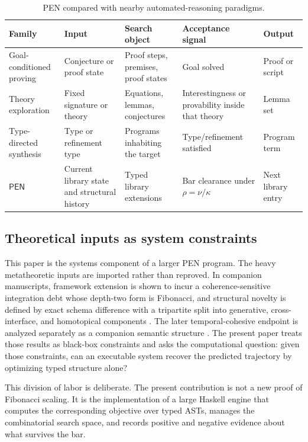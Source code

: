 \documentclass[pdflatex,sn-mathphys,Numbered]{sn-jnl}
\theoremstyle{thmstyleone}
\theoremstyle{thmstylethree}
\theoremstyle{thmstyletwo}
\newcommand{\PEN}{\ensuremath{\mathsf{PEN}}}
\begin{document}
\begin{table}[t]
\centering
\caption{PEN compared with nearby automated-reasoning paradigms.}
\label{tab:comparison}
\footnotesize
\begin{tabular}{@{}p{2.55cm}p{2.35cm}p{2.5cm}p{2.6cm}p{2.1cm}@{}}
\toprule
Family & Input & Search object & Acceptance signal & Output \\
\midrule
Goal-conditioned proving & Conjecture or proof state & Proof steps, premises, proof states & Goal solved & Proof or script \\
Theory exploration & Fixed signature or theory & Equations, lemmas, conjectures & Interestingness or provability inside that theory & Lemma set \\
Type-directed synthesis & Type or refinement type & Programs inhabiting the target & Type/refinement satisfied & Program term \\
\PEN{} & Current library state and structural history & Typed library extensions & Bar clearance under $\rho=\nu/\kappa$ & Next library entry \\
\bottomrule
\end{tabular}
\end{table}

\subsection{Theoretical inputs as system constraints}

This paper is the systems component of a larger PEN program. The heavy metatheoretic inputs are imported rather than reproved. In companion manuscripts, framework extension is shown to incur a coherence-sensitive integration debt whose depth-two form is Fibonacci, and structural novelty is defined by exact schema difference with a tripartite split into generative, cross-interface, and homotopical components \cite{lande-coherence,lande-generative}. The later temporal-cohesive endpoint is analyzed separately as a companion semantic structure \cite{lande-dct}. The present paper treats those results as black-box constraints and asks the computational question: given those constraints, can an executable system recover the predicted trajectory by optimizing typed structure alone?

This division of labor is deliberate. The present contribution is not a new proof of Fibonacci scaling. It is the implementation of a large Haskell engine that computes the corresponding objective over typed ASTs, manages the combinatorial search space, and records positive and negative evidence about what survives the bar.
\end{document}
